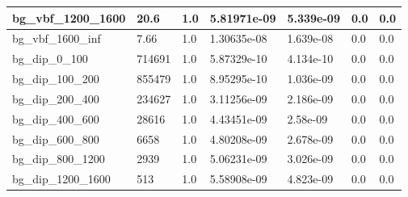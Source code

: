 \documentclass[a4paper, 10pt]{article}
\begin{document}
\begin{table}[H]
\begin{center}
\begin{tabular}{|m{23.0mm}|m{23.0mm}|m{18.0mm}|m{19.0mm}|m{19.0mm}|m{19.0mm}|m{19.0mm}|}
      \hline
      {\cellcolor{white}         bg\_vbf\_1200\_1600}& {\cellcolor{white}         20.6}& {\cellcolor{white}         1.0}& {\cellcolor{white}         5.81971e-09}& {\cellcolor{white}         5.339e-09}& {\cellcolor{green}         0.0}& {\cellcolor{green}         0.0}\\
      \hline
      {\cellcolor{white}         bg\_vbf\_1600\_inf}& {\cellcolor{white}         7.66}& {\cellcolor{white}         1.0}& {\cellcolor{white}         1.30635e-08}& {\cellcolor{white}         1.639e-08}& {\cellcolor{green}         0.0}& {\cellcolor{green}         0.0}\\
      \hline
      {\cellcolor{white}         bg\_dip\_0\_100}& {\cellcolor{white}         714691}& {\cellcolor{white}         1.0}& {\cellcolor{white}         5.87329e-10}& {\cellcolor{white}         4.134e-10}& {\cellcolor{green}         0.0}& {\cellcolor{green}         0.0}\\
      \hline
      {\cellcolor{white}         bg\_dip\_100\_200}& {\cellcolor{white}         855479}& {\cellcolor{white}         1.0}& {\cellcolor{white}         8.95295e-10}& {\cellcolor{white}         1.036e-09}& {\cellcolor{green}         0.0}& {\cellcolor{green}         0.0}\\
      \hline
      {\cellcolor{white}         bg\_dip\_200\_400}& {\cellcolor{white}         234627}& {\cellcolor{white}         1.0}& {\cellcolor{white}         3.11256e-09}& {\cellcolor{white}         2.186e-09}& {\cellcolor{green}         0.0}& {\cellcolor{green}         0.0}\\
      \hline
      {\cellcolor{white}         bg\_dip\_400\_600}& {\cellcolor{white}         28616}& {\cellcolor{white}         1.0}& {\cellcolor{white}         4.43451e-09}& {\cellcolor{white}         2.58e-09}& {\cellcolor{green}         0.0}& {\cellcolor{green}         0.0}\\
      \hline
      {\cellcolor{white}         bg\_dip\_600\_800}& {\cellcolor{white}         6658}& {\cellcolor{white}         1.0}& {\cellcolor{white}         4.80208e-09}& {\cellcolor{white}         2.678e-09}& {\cellcolor{green}         0.0}& {\cellcolor{green}         0.0}\\
      \hline
      {\cellcolor{white}         bg\_dip\_800\_1200}& {\cellcolor{white}         2939}& {\cellcolor{white}         1.0}& {\cellcolor{white}         5.06231e-09}& {\cellcolor{white}         3.026e-09}& {\cellcolor{green}         0.0}& {\cellcolor{green}         0.0}\\
      \hline
      {\cellcolor{white}         bg\_dip\_1200\_1600}& {\cellcolor{white}         513}& {\cellcolor{white}         1.0}& {\cellcolor{white}         5.58908e-09}& {\cellcolor{white}         4.823e-09}& {\cellcolor{green}         0.0}& {\cellcolor{green}         0.0}\\

\end{tabular}
\end{center}
\end{table}
\end{document}
